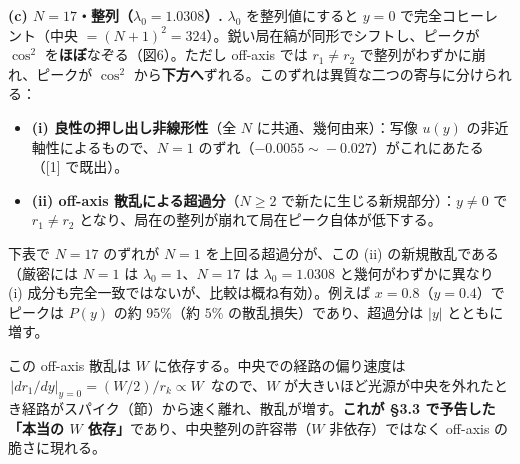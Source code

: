 \documentclass[
]{ltjsarticle}
\providecommand{\tightlist}{%
  \setlength{\itemsep}{0pt}\setlength{\parskip}{0pt}}
\begin{document}
\textbf{(c) \(N=17\)・整列（\(\lambda_0=1.0308\)）.} \(\lambda_0\)
を整列値にすると \(y=0\) で完全コヒーレント（中央
\(=(N+1)^2=324\)）。鋭い局在縞が同形でシフトし、ピークが \(\cos^2\)
を\textbf{ほぼ}なぞる（図6）。ただし off-axis では \(r_1\neq r_2\)
で整列がわずかに崩れ、ピークが \(\cos^2\)
から\textbf{下方へ}ずれる。このずれは異質な二つの寄与に分けられる：

\begin{itemize}
\tightlist
\item
  \textbf{(i) 良性の押し出し非線形性}（全 \(N\) に共通、幾何由来）：写像
  \(u(y)\) の非近軸性によるもので、\(N=1\)
  のずれ（\(-0.0055\!\sim\!-0.027\)）がこれにあたる（{[}1{]} で既出）。
\item
  \textbf{(ii) off-axis 散乱による超過分}（\(N\ge2\)
  で新たに生じる新規部分）：\(y\neq0\) で \(r_1\neq r_2\)
  となり、局在の整列が崩れて局在ピーク自体が低下する。
\end{itemize}

下表で \(N=17\) のずれが \(N=1\) を上回る超過分が、この (ii)
の新規散乱である（厳密には \(N=1\) は \(\lambda_0=1\)、\(N=17\) は
\(\lambda_0=1.0308\) と幾何がわずかに異なり (i)
成分も完全一致ではないが、比較は概ね有効）。例えば
\(x=0.8\)（\(y=0.4\)）でピークは \(P(y)\) の約 \(95\%\)（約 \(5\%\)
の散乱損失）であり、超過分は \(|y|\) とともに増す。

この off-axis 散乱は \(W\) に依存する。中央での経路の偏り速度は
\(\,\big|dr_1/dy\big|_{y=0}=(W/2)/r_k\propto W\,\) なので、\(W\)
が大きいほど光源が中央を外れたとき経路がスパイク（節）から速く離れ、散乱が増す。\textbf{これが
§3.3 で予告した「本当の \(W\) 依存」}であり、中央整列の許容帯（\(W\)
非依存）ではなく off-axis の脆さに現れる。
\end{document}
